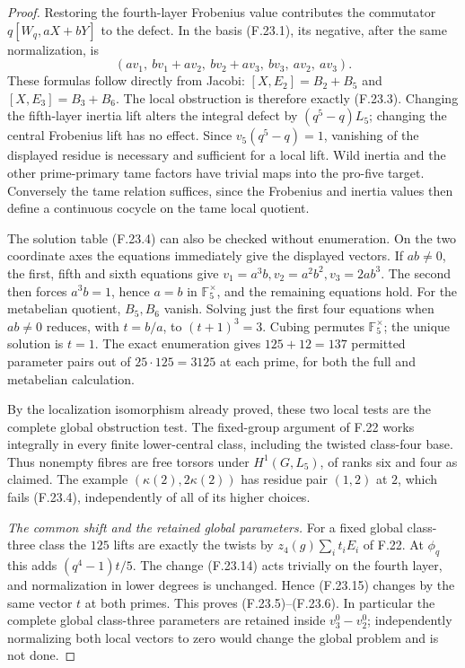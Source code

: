 \begin{proof}
Restoring the fourth-layer Frobenius value contributes
the commutator \(q[W_q,aX+bY]\) to the defect. In the basis
(F.23.1), its negative, after the same normalization, is
\[
 (av_1,\ bv_1+av_2,\ bv_2+av_3,\ bv_3,\ av_2,\ av_3).
                                                               \tag{F.23.18}
\]
These formulas follow directly from Jacobi:
\([X,E_2]=B_2+B_5\) and \([X,E_3]=B_3+B_6\).
The local obstruction is therefore exactly
(F.23.3). Changing the fifth-layer inertia lift alters
the integral defect by \((q^5-q)L_5\); changing the
central Frobenius lift has no effect. Since
\(v_5(q^5-q)=1\), vanishing of the displayed residue
is necessary and sufficient for a local lift.
Wild inertia and the other prime-primary tame factors
have trivial maps into the pro-five target. Conversely
the tame relation suffices, since the Frobenius and
inertia values then define a continuous cocycle on the
tame local quotient.

The solution table (F.23.4) can also be checked without
enumeration. On the two coordinate axes the equations
immediately give the displayed vectors. If \(ab\ne0\),
the first, fifth and sixth equations give
\(v_1=a^3b,v_2=a^2b^2,v_3=2ab^3\).
The second then forces \(a^3b=1\), hence \(a=b\) in
\(\mathbb F_5^\times\), and the remaining equations hold.
For the metabelian quotient, \(B_5,B_6\) vanish.
Solving just the first four equations when \(ab\ne0\)
reduces, with \(t=b/a\), to
\((t+1)^3=3\). Cubing permutes \(\mathbb F_5^\times\);
the unique solution is \(t=1\).
The exact enumeration gives \(125+12=137\) permitted
parameter pairs out of \(25\cdot125=3125\) at each prime,
for both the full and metabelian calculation.

By the localization isomorphism already proved, these
two local tests are the complete global obstruction test.
The fixed-group argument of F.22 works integrally in
every finite lower-central class, including the twisted
class-four base. Thus nonempty fibres are free torsors
under \(H^1(G,L_5)\), of ranks six and four as claimed.
The example \((\kappa(2),2\kappa(2))\) has residue pair
\((1,2)\) at \(2\), which fails (F.23.4), independently
of all of its higher choices.

\emph{The common shift and the retained global parameters.}
For a fixed global class-three class the \(125\) lifts
are exactly the twists by
\(z_4(g)\sum_i t_iE_i\) of F.22. At \(\phi_q\) this
adds \((q^4-1)t/5\). The change (F.23.14) acts trivially
on the fourth layer, and normalization in lower degrees
is unchanged. Hence (F.23.15) changes by the same vector
\(t\) at both primes. This proves (F.23.5)--(F.23.6).
In particular the complete global class-three parameters
are retained inside \(v_3^0-v_2^0\); independently
normalizing both local vectors to zero would change
the global problem and is not done.


\end{proof}
